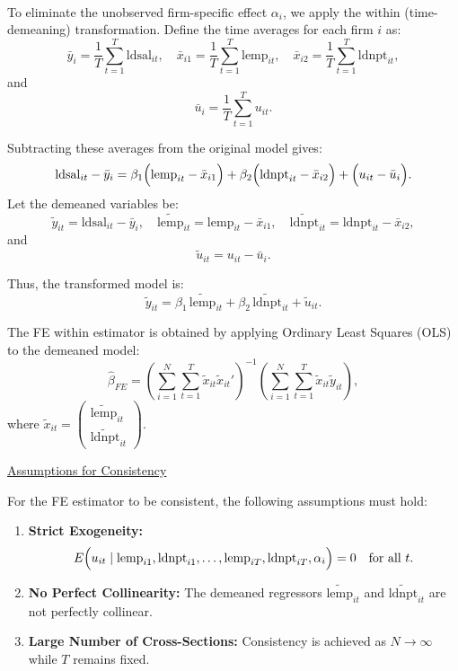 \documentclass[a4paper,12pt]{article} %
\theoremstyle{nonitalic}
\newenvironment{solution}[1]
  {\renewcommand\theinnercustomsol{#1}\innercustomsol}
  {\endinnercustomsol}
\newcounter{solutionctr}
\renewcommand{\thesolutionctr}{(\alph{solutionctr})}
\newenvironment{autosolution}
  {\stepcounter{solutionctr}\begin{solution}{\thesolutionctr}}
  {\end{solution}}
\begin{document}
\begin{autosolution}
\    

To eliminate the unobserved firm-specific effect \(\alpha_i\), we apply the within (time-demeaning) transformation. Define the time averages for each firm \(i\) as:
\[
\bar{y}_i = \frac{1}{T}\sum_{t=1}^{T}\text{ldsal}_{it}, \quad \bar{x}_{i1} = \frac{1}{T}\sum_{t=1}^{T}\text{lemp}_{it}, \quad \bar{x}_{i2} = \frac{1}{T}\sum_{t=1}^{T}\text{ldnpt}_{it},
\]
and
\[
\bar{u}_i = \frac{1}{T}\sum_{t=1}^{T}u_{it}.
\]

Subtracting these averages from the original model gives:
\[
\text{ldsal}_{it} - \bar{y}_i = \beta_1\Bigl(\text{lemp}_{it} - \bar{x}_{i1}\Bigr) + \beta_2\Bigl(\text{ldnpt}_{it} - \bar{x}_{i2}\Bigr) + \Bigl(u_{it} - \bar{u}_i\Bigr).
\]
Let the demeaned variables be:
\[
\tilde{y}_{it} = \text{ldsal}_{it} - \bar{y}_i, \quad \tilde{\text{lemp}}_{it} = \text{lemp}_{it} - \bar{x}_{i1}, \quad \tilde{\text{ldnpt}}_{it} = \text{ldnpt}_{it} - \bar{x}_{i2},
\]
and
\[
\tilde{u}_{it} = u_{it} - \bar{u}_i.
\]

Thus, the transformed model is:
\[
\tilde{y}_{it} = \beta_1\,\tilde{\text{lemp}}_{it} + \beta_2\,\tilde{\text{ldnpt}}_{it} + \tilde{u}_{it}.
\]

The FE within estimator is obtained by applying Ordinary Least Squares (OLS) to the demeaned model:
\[
\hat{\beta}_{FE} = \left( \sum_{i=1}^{N}\sum_{t=1}^{T} \tilde{x}_{it}\tilde{x}_{it}' \right)^{-1}\left( \sum_{i=1}^{N}\sum_{t=1}^{T} \tilde{x}_{it}\tilde{y}_{it} \right),
\]
where \(\tilde{x}_{it} = \begin{pmatrix}\tilde{\text{lemp}}_{it} \\ \tilde{\text{ldnpt}}_{it}\end{pmatrix}\).

\underline{Assumptions for Consistency}

For the FE estimator to be consistent, the following assumptions must hold:
\begin{enumerate}
    \item \textbf{Strict Exogeneity:} 
    \[
    E\Bigl(u_{it}\mid \text{lemp}_{i1}, \text{ldnpt}_{i1}, \dots, \text{lemp}_{iT}, \text{ldnpt}_{iT}, \alpha_i\Bigr)=0 \quad \text{for all } t.
    \]
    \item \textbf{No Perfect Collinearity:} The demeaned regressors \(\tilde{\text{lemp}}_{it}\) and \(\tilde{\text{ldnpt}}_{it}\) are not perfectly collinear.
    \item \textbf{Large Number of Cross-Sections:} Consistency is achieved as \(N \to \infty\) while \(T\) remains fixed.
\end{enumerate}


\end{autosolution}
\end{document}
